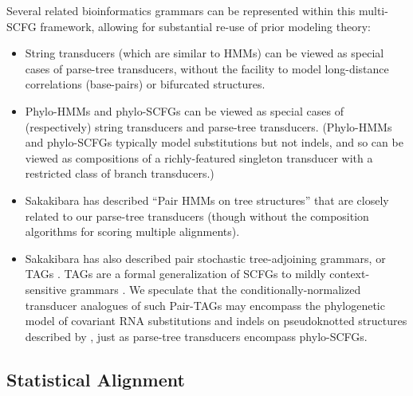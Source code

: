 \documentclass[10pt]{article}
\begin{document}
Several related bioinformatics grammars can be represented within this multi-SCFG framework,
allowing for substantial re-use of prior modeling theory:
\begin{itemize}
\item String transducers (which are similar to HMMs) can be viewed as special cases of parse-tree transducers,
without the facility to model long-distance correlations (base-pairs) or bifurcated structures.
\item Phylo-HMMs and phylo-SCFGs \cite{KlostermanEtAl2006}
can be viewed as special cases of (respectively) string transducers and parse-tree transducers.
(Phylo-HMMs and phylo-SCFGs typically model substitutions but not indels,
and so can be viewed as compositions of a richly-featured singleton transducer with a restricted class of branch transducers.)
\item Sakakibara \cite{Sakakibara2003} has described ``Pair HMMs on tree structures'' that are closely related to our parse-tree transducers
(though without the composition algorithms for scoring multiple alignments).
\item Sakakibara has also described pair stochastic tree-adjoining grammars, or TAGs \cite{Sakakibara2004}.
TAGs are a formal generalization of SCFGs to
mildly context-sensitive grammars \cite{MamitsukaAbe94,JoshiSchabes97,RivasEddy2000}.
We speculate that the conditionally-normalized transducer analogues of such Pair-TAGs may encompass the
phylogenetic model of covariant RNA substitutions and indels on pseudoknotted structures
described by \cite{MeyerMiklos2007},
just as parse-tree transducers encompass phylo-SCFGs.
\end{itemize}

\subsection{Statistical Alignment}
\end{document}
